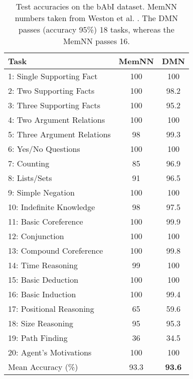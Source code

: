\documentclass{article}
\begin{document}
\begin{table}[t!]
\begin{center}
\begin{tabular}{l c c } \toprule
    {Task}& {MemNN} & {DMN} \\ \midrule
    1: Single Supporting Fact & 100 & 100  \\
    2: Two Supporting Facts  & {100} & 98.2  \\
    3: Three Supporting Facts  & {100} & 95.2  \\
    4: Two Argument Relations  & 100 & 100  \\ 
    5: Three Argument Relations   & 98 & {99.3} \\
    6: Yes/No Questions  & 100 & 100  \\
    7: Counting  & 85 & {96.9}   \\
    8: Lists/Sets  & 91 & {96.5}  \\ 
    9: Simple Negation  & 100 & 100  \\
    10: Indefinite Knowledge   & 98 & 97.5  \\
    11: Basic Coreference  & 100 & 99.9 \\
    12: Conjunction   & 100 & 100  \\
    13: Compound Coreference   & 100 & 99.8 \\
    14: Time Reasoning   & 99 & 100   \\
    15: Basic Deduction   & 100 & 100 \\
    16: Basic Induction   & 100 & 99.4 \\
    17: Positional Reasoning   & {65} & 59.6 \\
    18: Size Reasoning   & 95 & 95.3 \\
    19: Path Finding   & {36} & 34.5 \\
    20: Agent's Motivations   & 100 & 100 \\
    \midrule
    Mean Accuracy (\%) & 93.3 & \textbf{93.6} \\
    \bottomrule
\end{tabular}
\end{center}
\vspace{-0.3cm}
\caption{Test accuracies on the bAbI dataset. MemNN numbers taken from Weston et al. \cite{Weston2015ToyTasks}. 
The DMN passes (accuracy  95\%) 18 tasks, whereas the MemNN passes 16.
}
\label{babiresults}
\vspace{-0.3cm}
\end{table}
\end{document}

